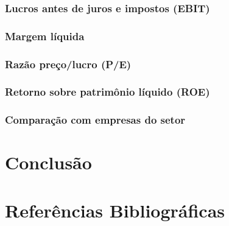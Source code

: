 \documentclass[grad,numbers]{coppe}
\begin{document}
  \hypertarget{lucros-antes-de-juros-e-impostos-ebit}{%
  \subsection{Lucros antes de juros e impostos (EBIT)}\label{lucros-antes-de-juros-e-impostos-ebit}}
  
  \hypertarget{margem-luxedquida}{%
  \subsection{Margem líquida}\label{margem-luxedquida}}
  
  \hypertarget{razuxe3o-preuxe7olucro-pe}{%
  \subsection{Razão preço/lucro (P/E)}\label{razuxe3o-preuxe7olucro-pe}}
  
  \hypertarget{retorno-sobre-patrimuxf4nio-luxedquido-roe}{%
  \subsection{Retorno sobre patrimônio líquido (ROE)}\label{retorno-sobre-patrimuxf4nio-luxedquido-roe}}
  
  \hypertarget{comparauxe7uxe3o-com-empresas-do-setor}{%
  \subsection{Comparação com empresas do setor}\label{comparauxe7uxe3o-com-empresas-do-setor}}
  
  \hypertarget{conclusuxe3o}{%
  \chapter{Conclusão}\label{conclusuxe3o}}
  
  \backmatter
  
  \hypertarget{referuxeancias-bibliogruxe1ficas}{%
  \chapter*{Referências Bibliográficas}\label{referuxeancias-bibliogruxe1ficas}}
  
  
  \label{bib:begin}
  \noindent
  
  \setlength{\parindent}{-0.20in}
  \setlength{\leftskip}{0.20in}
  \setlength{\parskip}{8pt}
  
\end{document}
